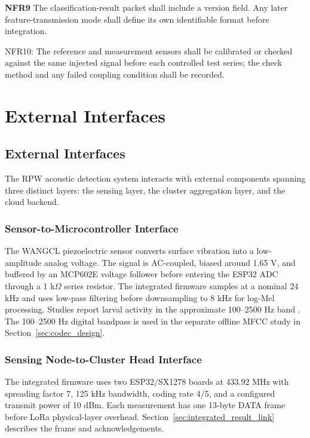 \documentclass[12pt,a4paper,oneside]{memoir}
\newcommand{\newrevision}[1]{#1}
\begin{document}
\newrevision{\textbf{NFR9} The classification-result packet shall include a version field. Any later feature-transmission mode shall define its own identifiable format before integration.}

\newrevision{NFR10: The reference and measurement sensors shall be calibrated or checked against the same injected signal before each controlled test series; the check method and any failed coupling condition shall be recorded.}
 
\section{\newrevision{External Interfaces}}
 
\subsection*{External Interfaces}
 
The RPW acoustic detection system interacts with external components spanning three distinct layers: the sensing layer, the cluster aggregation layer, and the cloud backend.
 
\subsubsection*{Sensor-to-Microcontroller Interface}
 
\newrevision{The WANGCL piezoelectric sensor converts surface vibration into a low-amplitude analog voltage. The signal is AC-coupled, biased around 1.65 V, and buffered by an MCP602E voltage follower before entering the ESP32 ADC through a 1 k$\Omega$ series resistor. The integrated firmware samples at a nominal 24 kHz and uses low-pass filtering before downsampling to 8 kHz for log-Mel processing. Studies report larval activity in the approximate 100--2500 Hz band \cite{pinhas2008,rach2013}. The 100--2500 Hz digital bandpass is used in the separate offline MFCC study in Section~\ref{sec:codec_design}.}
 
\subsubsection*{Sensing Node-to-Cluster Head Interface}
 
\newrevision{The integrated firmware uses two ESP32/SX1278 boards at 433.92 MHz with spreading factor 7, 125 kHz bandwidth, coding rate 4/5, and a configured transmit power of 10 dBm. Each measurement has one 13-byte DATA frame before LoRa physical-layer overhead. Section~\ref{sec:integrated_result_link} describes the frame and acknowledgements.}
 
\end{document}
